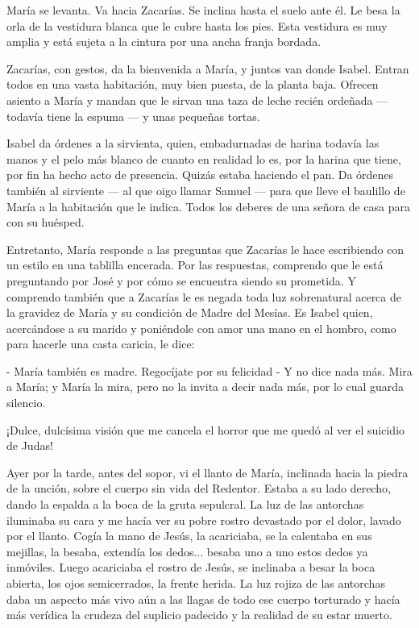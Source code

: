 \documentclass[12pt, twoside, openright]{book} %
\begin{document}
María se levanta. Va hacia Zacarías. Se inclina hasta el suelo ante él. Le besa la orla de la vestidura blanca que le cubre hasta los pies. Esta vestidura es muy amplia y está sujeta a la cintura por una ancha franja bordada. 

Zacarías, con gestos, da la bienvenida a María, y juntos van donde Isabel. Entran todos en una vasta habitación, muy bien puesta, de la planta baja. Ofrecen asiento a María y mandan que le sirvan una taza de leche recién ordeñada — todavía tiene la espuma — y unas pequeñas tortas. 

Isabel da órdenes a la sirvienta, quien, embadurnadas de harina todavía las manos y el pelo más blanco de cuanto en realidad lo es, por la harina que tiene, por fin ha hecho acto de presencia. Quizás estaba haciendo el pan. Da órdenes también al sirviente — al que oigo llamar Samuel — para que lleve el baulillo de María a la habitación que le indica. Todos los deberes de una señora de casa para con su huésped. 

Entretanto, María responde a las preguntas que Zacarías le hace escribiendo con un estilo en una tablilla encerada. Por las respuestas, comprendo que le está preguntando por José y por cómo se encuentra siendo su prometida. Y comprendo también que a Zacarías le es negada toda luz sobrenatural acerca de la gravidez de María y su condición de Madre del Mesías. Es Isabel quien, acercándose a su marido y poniéndole con amor una mano en el hombro, como para hacerle una casta caricia, le dice: 

- María también es madre. Regocíjate por su felicidad - Y no dice nada más. Mira a María; y María la mira, pero no la invita a decir nada más, por lo cual guarda silencio. 

¡Dulce, dulcísima visión que me cancela el horror que me quedó al ver el suicidio de Judas! 

Ayer por la tarde, antes del sopor, vi el llanto de María, inclinada hacia la piedra de la unción, sobre el cuerpo sin vida del Redentor. Estaba a su lado derecho, dando la espalda a la boca de la gruta sepulcral. La luz de las antorchas iluminaba su cara y me hacía ver su pobre rostro devastado por el dolor, lavado por el llanto. Cogía la mano de Jesús, la acariciaba, se la calentaba en sus mejillas, la besaba, extendía los dedos... besaba uno a uno estos dedos ya inmóviles. Luego acariciaba el rostro de Jesús, se inclinaba a besar la boca abierta, los ojos semicerrados, la frente herida. La luz rojiza de las antorchas daba un aspecto más vivo aún a las llagas de todo ese cuerpo torturado y hacía más verídica la crudeza del suplicio padecido y la realidad de su estar muerto. 
\end{document}

